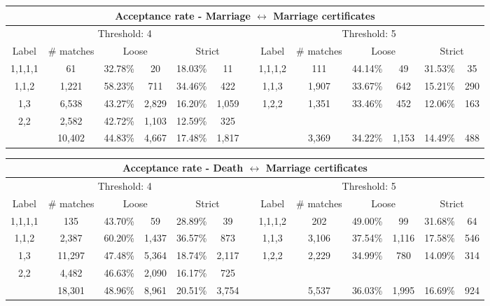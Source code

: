 \begin{table}
\begin{center}
		\resizebox{\columnwidth}{!} {
			\begin{tabular}{*{13}{c}}
				\toprule
				\multicolumn{13}{c}{Acceptance rate - Marriage $\leftrightarrow$ Marriage certificates }\\
				\midrule
				\multicolumn{6}{c}{Threshold: 4} && \multicolumn{6}{c}{Threshold: 5}\\
				\cmidrule{1-6} \cmidrule{8-13}
				Label 	& \# matches & \multicolumn{2}{c}{Loose}	& \multicolumn{2}{c}{Strict} && Label 	& \# matches & \multicolumn{2}{c}{Loose}	& \multicolumn{2}{c}{Strict} \\
				\cmidrule{1-2} \cmidrule{3-4} \cmidrule{5-6} \cmidrule{8-13} 
				1,1,1,1 & 61 		& 32.78\% & 20 		& 18.03\% & 11 		&& 1,1,1,2 	& 111		& 44.14\% & 49		& 31.53\% & 35\\
				1,1,2 	& 1,221		& 58.23\% & 711		& 34.46\% & 422		&& 1,1,3 	& 1,907		& 33.67\% & 642		& 15.21\% & 290\\
				1,3 	& 6,538		& 43.27\% & 2,829	& 16.20\% & 1,059	&& 1,2,2 	& 1,351		& 33.46\% & 452		& 12.06\% & 163\\
				2,2 	& 2,582		& 42.72\% & 1,103	& 12.59\% & 325		&&  		& 			&  	 & 	&  & \\
				\midrule
						& 10,402	& 44.83\% & 4,667 	& 17.48\% & 1,817	&&			& 3,369		& 34.22\% & 1,153 	& 14.49\% & 488\\
				\bottomrule
			\end{tabular}
		}

		\bigskip

		\resizebox{\columnwidth}{!} {
			\begin{tabular}{*{13}{c}}
				\toprule
				\multicolumn{13}{c}{Acceptance rate - Death $\leftrightarrow$ Marriage certificates}\\
				\midrule
				\multicolumn{6}{c}{Threshold: 4} && \multicolumn{6}{c}{Threshold: 5}\\
				\cmidrule{1-6} \cmidrule{8-13}
				Label 	& \# matches & \multicolumn{2}{c}{Loose}	& \multicolumn{2}{c}{Strict} && Label 	& \# matches & \multicolumn{2}{c}{Loose}	& \multicolumn{2}{c}{Strict} \\
				\cmidrule{1-2} \cmidrule{3-4} \cmidrule{5-6} \cmidrule{8-13} 
				1,1,1,1	& 135 		& 43.70\% & 59 		& 28.89\%	& 39	&& 1,1,1,2 & 202	& 49.00\% & 99 		& 31.68\% & 64	\\
				1,1,2 	& 2,387		& 60.20\% & 1,437	& 36.57\%	& 873	&& 1,1,3   & 3,106	& 37.54\% & 1,116	& 17.58\% & 546	\\
				1,3 	& 11,297	& 47.48\% & 5,364	& 18.74\%	& 2,117	&& 1,2,2   & 2,229	& 34.99\% & 780		& 14.09\% &	314	\\
				2,2 	& 4,482		& 46.63\% & 2,090	& 16.17\%	& 725	&&   & &   & 	&   & 	\\
				\midrule
						& 18,301	& 48.96\% & 8,961 	& 20.51\%	& 3,754	&&		   & 5,537 & 36.03\% &  1,995	& 16.69\%  & 924\\
				\bottomrule
			\end{tabular}
		}
	\end{center}
\end{table}



